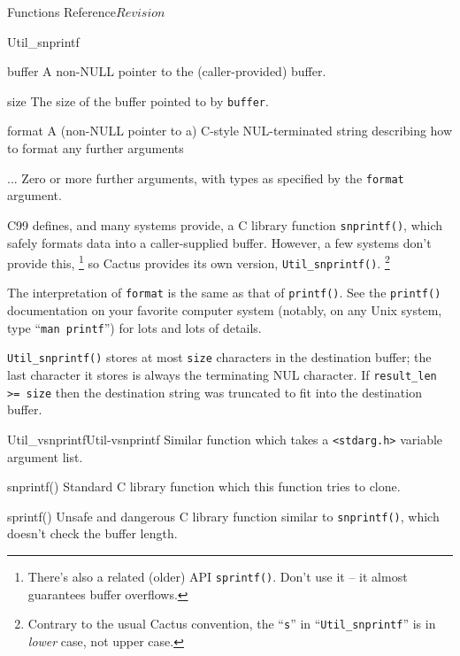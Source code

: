 \begin{cactuspart}{ Functions Reference}{}{$Revision$}
\begin{FunctionDescription}{Util\_snprintf}
\begin{ParameterSection}
\begin{Parameter}{buffer}
A non-NULL pointer to the (caller-provided) buffer.
\end{Parameter}
\begin{Parameter}{size}
The size of the buffer pointed to by \verb|buffer|.
\end{Parameter}
\begin{Parameter}{format}
A (non-NULL pointer to a) C-style NUL-terminated string describing
how to format any further arguments
\end{Parameter}
\begin{Parameter}{...}
Zero or more further arguments, with types as specified by the
\verb|format| argument.
\end{Parameter}
\end{ParameterSection}

\begin{Discussion}
C99 defines, and many systems provide, a C library function \verb|snprintf()|,
which safely formats data into a caller-supplied buffer.  However, a few
systems don't provide this,%
\footnote{%
	 There's also a related (older) API \texttt{sprintf()}.
	 Don't use it -- it almost guarantees buffer
	 overflows.
	 }%
{} so Cactus provides its own version, \verb|Util_snprintf()|.%
\footnote{%
	 Contrary to the usual Cactus convention, the
	 ``\texttt{s}'' in ``\texttt{Util\_snprintf}''
	 is in \emph{lower} case, not upper case.
	 }%

The interpretation of \verb|format| is the same as that of \verb|printf()|.
See the \verb|printf()| documentation on your favorite computer system
(notably, on any Unix system, type ``\verb|man printf|'') for lots and lots
of details.

\verb|Util_snprintf()| stores at most \verb|size| characters
in the destination buffer; the last character it stores is always
the terminating NUL character.  If \verb|result_len >= size| then
the destination string was truncated to fit into the destination buffer.
\end{Discussion}

\begin{SeeAlsoSection}
\begin{SeeAlso2}{Util\_vsnprintf}{Util-vsnprintf}
Similar function which takes a \verb|<stdarg.h>| variable argument list.
\end{SeeAlso2}
\begin{SeeAlso}{snprintf()}
Standard C library function which this function tries to clone.
\end{SeeAlso}
\begin{SeeAlso}{sprintf()}
Unsafe and dangerous C library function similar to \verb|snprintf()|,
which doesn't check the buffer length.
\end{SeeAlso}
\end{SeeAlsoSection}


\end{FunctionDescription}
\end{cactuspart}
